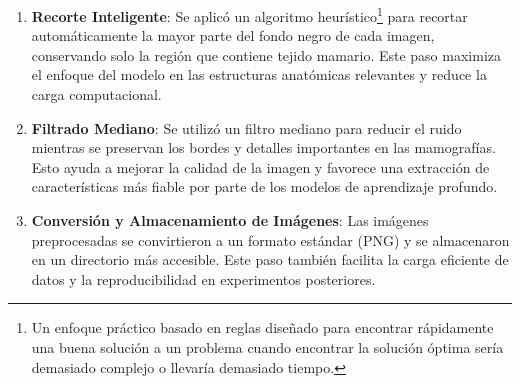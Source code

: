 \documentclass[a4paper,10pt]{book}
\begin{document}
\begin{enumerate}
\item \textbf{Recorte Inteligente}: Se aplicó un algoritmo heurístico\footnote{Un enfoque práctico basado en reglas diseñado para encontrar rápidamente una buena solución a un problema cuando encontrar la solución óptima sería demasiado complejo o llevaría demasiado tiempo.} para recortar automáticamente la mayor parte del fondo negro de cada imagen, conservando solo la región que contiene tejido mamario. Este paso maximiza el enfoque del modelo en las estructuras anatómicas relevantes y reduce la carga computacional.
\item \textbf{Filtrado Mediano}: Se utilizó un filtro mediano para reducir el ruido mientras se preservan los bordes y detalles importantes en las mamografías. Esto ayuda a mejorar la calidad de la imagen y favorece una extracción de características más fiable por parte de los modelos de aprendizaje profundo.
\item \textbf{Conversión y Almacenamiento de Imágenes}: Las imágenes preprocesadas se convirtieron a un formato estándar (PNG) y se almacenaron en un directorio más accesible. Este paso también facilita la carga eficiente de datos y la reproducibilidad en experimentos posteriores.
\end{enumerate}
\end{document}
